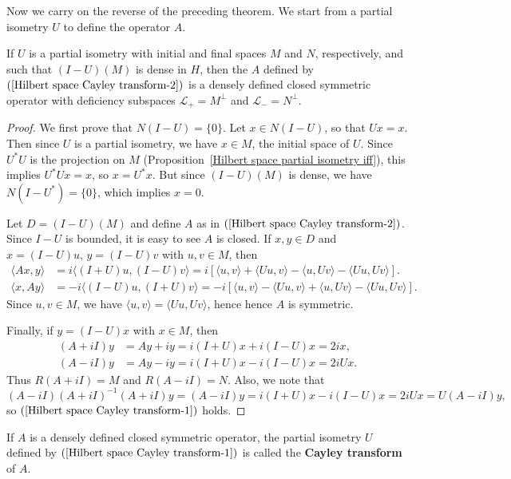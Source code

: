 Now we carry on the reverse of the preceding theorem. We start from a partial isometry $U$ to define the operator $A$.
\begin{theorem}
If $U$ is a partial isometry with initial and final spaces $M$ and $N$, respectively, and such that $(I-U)(M)$ is dense in $H$, then the $A$ defined by $(\ref{Hilbert space Cayley transform-2})$ is a densely defined closed symmetric operator with deficiency subspaces $\mathscr{L}_+=M^\bot$ and $\mathscr{L}_-=N^\bot$.
\end{theorem}
\begin{proof}
We first prove that $N(I-U)=\{0\}$. Let $x\in N(I-U)$, so that $Ux=x$. Then since $U$ is a partial isometry, we have $x\in M$, the initial space of $U$. Since $U^*U$ is the projection on $M$ (Proposition~\ref{Hilbert space partial isometry iff}), this implies $U^*Ux=x$, so $x=U^*x$. But since $(I-U)(M)$ is dense, we have $N(I-U^*)=\{0\}$, which implies $x=0$.\par
Let $D=(I-U)(M)$ and define $A$ as in $(\ref{Hilbert space Cayley transform-2})$. Since $I-U$ is bounded, it is easy to see $A$ is closed. If $x,y\in D$ and $x=(I-U)u$, $y=(I-U)v$ with $u,v\in M$, then
\begin{align*}
\langle Ax,y\rangle&=i\langle(I+U)u,(I-U)v\rangle=i[\langle u,v\rangle+\langle Uu,v\rangle-\langle u,Uv\rangle-\langle Uu,Uv\rangle].\\
\langle x,Ay\rangle&=-i\langle(I-U)u,(I+U)v\rangle=-i[\langle u,v\rangle-\langle Uu,v\rangle+\langle u,Uv\rangle-\langle Uu,Uv\rangle].
\end{align*}
Since $u,v\in M$, we have $\langle u,v\rangle=\langle Uu,Uv\rangle$, hence hence $A$ is symmetric.\par
Finally, if $y=(I-U)x$ with $x\in M$, then
\begin{equation}\label{Hilbert space Cayley transform-4}
\begin{aligned}
(A+iI)y&=Ay+iy=i(I+U)x+i(I-U)x=2ix,\\
(A-iI)y&=Ay-iy=i(I+U)x-i(I-U)x=2iUx.
\end{aligned}
\end{equation}
Thus $R(A+iI)=M$ and $R(A-iI)=N$. Also, we note that
\[(A-iI)(A+iI)^{-1}(A+iI)y=(A-iI)y=i(I+U)x-i(I-U)x=2iUx=U(A-iI)y,\]
so $(\ref{Hilbert space Cayley transform-1})$ holds.
\end{proof}
\begin{definition}
If $A$ is a densely defined closed symmetric operator, the partial isometry $U$ defined by $(\ref{Hilbert space Cayley transform-1})$ is called the \textbf{Cayley transform} of $A$.
\end{definition}
